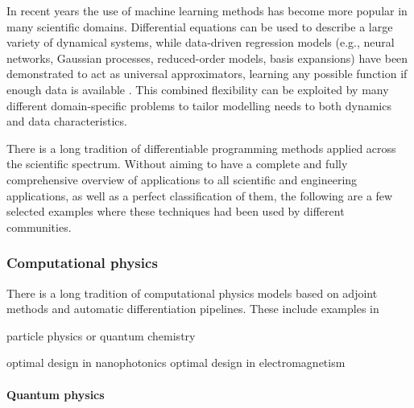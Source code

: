In recent years the use of machine learning methods has become more popular in many scientific domains. 
Differential equations can be used to describe a large variety of dynamical systems, while data-driven regression models (e.g., neural networks, Gaussian processes, reduced-order models, basis expansions) have been demonstrated to act as universal approximators, learning any possible function if enough data is available \cite{gorban_1998}. 
This combined flexibility can be exploited by many different domain-specific problems to tailor modelling needs to both dynamics and data characteristics.

There is a long tradition of differentiable programming methods applied across the scientific spectrum. 
Without aiming to have a complete and fully comprehensive overview of applications to all scientific and engineering applications, as well as a perfect classification of them, the following are a few selected examples where these techniques had been used by different communities. 

\subsubsection{Computational physics}

There is a long tradition of computational physics models based on adjoint methods and automatic differentiation pipelines. 
These include examples in 

particle physics \cite{Dorigo.2022} or quantum chemistry \cite{Arrazola.2021}

optimal design in nanophotonics \cite{Molesky_Lin_Piggott_Jin_Vucković_Rodriguez_2018}
optimal design in electromagnetism \cite{Georgieva_Glavic_Bakr_Bandler_2002}

\paragraph{Quantum physics}

